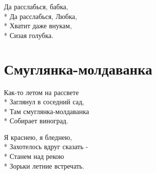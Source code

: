 \medskip

\begin{minipage}{\linewidth}
\hspace*{1.5em}Да расслабься, бабка,\\*
\hspace*{1.5em}Да расслабься, Любка,\\*
\hspace*{1.5em}Хватит даже внукам,\\*
\hspace*{1.5em}Сизая голубка.\\
\end{minipage}

\vspace{\fill}\newpage

\section{Смуглянка-молдаванка}
\label{song:Смуглянка-молдаванка}

\medskip

\begin{minipage}{\linewidth}
Как-то летом на рассвете\\*
Заглянул в соседний сад,\\*
Там смуглянка-молдаванка\\*
Собирает виноград.\\
\end{minipage}\par\medskip\nobreak

\medskip

\begin{minipage}{\linewidth}
Я краснею, я бледнею,\\*
Захотелось вдруг сказать -\\*
Станем над рекою\\*
Зорьки летние встречать.\\
\end{minipage}\par\medskip\nobreak

\medskip

